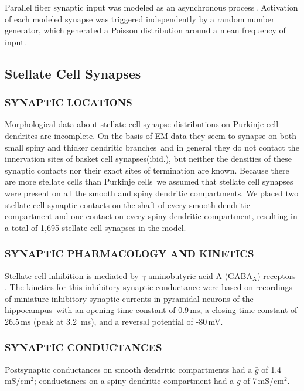 \documentclass[12pt]{article}
\begin{document}
Parallel fiber synaptic input was modeled
as an asynchronous process\,\cite{Bernard:1991ye}.
Activation of each modeled synapse was triggered independently
by a random number generator, which generated a Poisson distribution
around a mean frequency of input.

\subsection*{Stellate Cell Synapses}

\subsubsection*{SYNAPTIC LOCATIONS}

Morphological data about stellate cell
synapse distributions on Purkinje cell dendrites are incomplete.
On the basis of EM data they seem to synapse on both small spiny
and thicker dendritic branches\,\cite{Palay:1974fk} and
in general they do not contact the innervation sites of basket cell
synapses(ibid.), but neither the densities of these synaptic contacts
nor their exact sites of termination are known. Because there
are more stellate cells than Purkinje cells\,\cite{Ito:1984uq} we assumed
that stellate cell synapses were present on all the smooth and spiny
dendritic compartments. We placed two stellate cell synaptic contacts
on the shaft of every smooth dendritic compartment and one
contact on every spiny dendritic compartment, resulting in a total
of 1,695 stellate cell synapses in the model.

\subsubsection*{SYNAPTIC PHARMACOLOGY AND KINETICS}
Stellate cell inhibition
is mediated by $\gamma$-aminobutyric acid-A (GABA$_{\mbox{A}}$) receptors\,
\cite{Gabbot:1986fk, Ito:1984uq, Llano:1991uq}. The kinetics for
this inhibitory synaptic conductance were based on recordings of
miniature inhibitory synaptic currents in pyramidal neurons of
the hippocampus\,\cite{Ropert:1990kx} with an opening time constant
of 0.9\,ms, a closing time constant of 26.5\,ms (peak at 3.2\,
ms), and a reversal potential of -80\,mV.

\subsubsection*{SYNAPTIC CONDUCTANCES}
Postsynaptic conductances on
smooth dendritic compartments had a $\bar g$ of 1.4\,mS/cm$^2$; conductances
on a spiny dendritic compartment had a $\bar g$ of 7\,mS/cm$^2$.
\end{document}
